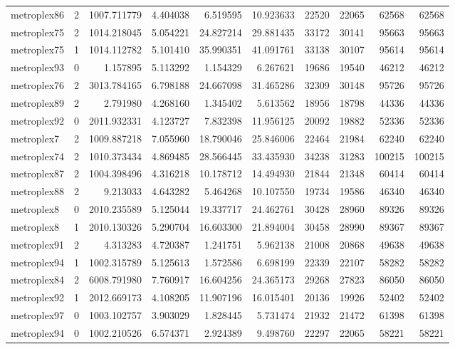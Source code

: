 \begin{longtable}{|l|r|r|r|r|r|r|r|r|r|}
metroplex86 & 2 & 1007.711779 & 4.404038 & 6.519595 & 10.923633 & 22520 & 22065 & 62568 & 62568 \\
metroplex75 & 2 & 1014.218045 & 5.054221 & 24.827214 & 29.881435 & 33172 & 30141 & 95663 & 95663 \\
metroplex75 & 1 & 1014.112782 & 5.101410 & 35.990351 & 41.091761 & 33138 & 30107 & 95614 & 95614 \\
metroplex93 & 0 & 1.157895 & 5.113292 & 1.154329 & 6.267621 & 19686 & 19540 & 46212 & 46212 \\
metroplex76 & 2 & 3013.784165 & 6.798188 & 24.667098 & 31.465286 & 32309 & 30148 & 95726 & 95726 \\
metroplex89 & 2 & 2.791980 & 4.268160 & 1.345402 & 5.613562 & 18956 & 18798 & 44336 & 44336 \\
metroplex92 & 0 & 2011.932331 & 4.123727 & 7.832398 & 11.956125 & 20092 & 19882 & 52336 & 52336 \\
metroplex7 & 2 & 1009.887218 & 7.055960 & 18.790046 & 25.846006 & 22464 & 21984 & 62240 & 62240 \\
metroplex74 & 2 & 1010.373434 & 4.869485 & 28.566445 & 33.435930 & 34238 & 31283 & 100215 & 100215 \\
metroplex87 & 2 & 1004.398496 & 4.316218 & 10.178712 & 14.494930 & 21844 & 21348 & 60414 & 60414 \\
metroplex88 & 2 & 9.213033 & 4.643282 & 5.464268 & 10.107550 & 19734 & 19586 & 46340 & 46340 \\
metroplex8 & 0 & 2010.235589 & 5.125044 & 19.337717 & 24.462761 & 30428 & 28960 & 89326 & 89326 \\
metroplex8 & 1 & 2010.130326 & 5.290704 & 16.603300 & 21.894004 & 30458 & 28990 & 89367 & 89367 \\
metroplex91 & 2 & 4.313283 & 4.720387 & 1.241751 & 5.962138 & 21008 & 20868 & 49638 & 49638 \\
metroplex94 & 1 & 1002.315789 & 5.125613 & 1.572586 & 6.698199 & 22339 & 22107 & 58282 & 58282 \\
metroplex84 & 2 & 6008.791980 & 7.760917 & 16.604256 & 24.365173 & 29268 & 27823 & 86050 & 86050 \\
metroplex92 & 1 & 2012.669173 & 4.108205 & 11.907196 & 16.015401 & 20136 & 19926 & 52402 & 52402 \\
metroplex97 & 0 & 1003.102757 & 3.903029 & 1.828445 & 5.731474 & 21932 & 21472 & 61398 & 61398 \\
metroplex94 & 0 & 1002.210526 & 6.574371 & 2.924389 & 9.498760 & 22297 & 22065 & 58221 & 58221 \\

\end{longtable}
